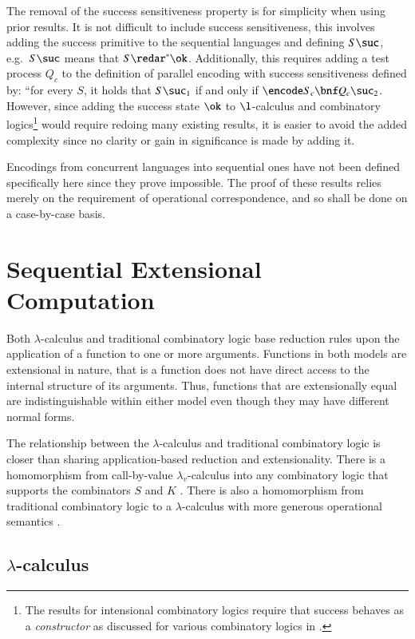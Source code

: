\documentclass{llncs}
\begin{document}
The removal of the success sensitiveness property is for simplicity when using prior
results.
It is not difficult to include success sensitiveness, this involves adding the success
primitive to the sequential languages and defining $S\suc$, e.g.~$S\suc$ means that
$S\redar^*\ok$.
Additionally, this requires adding a test process $Q_c$ to the definition of parallel encoding
with success sensitiveness defined by:
``for every $S$, it holds that $S \suc_1$ if and only if $\encode S _c \bnf Q_c\suc_2$.
However, since adding the success state $\ok$ to $\l$-calculus and combinatory
logics\footnote{The results for intensional combinatory logics require that success
behaves as a {\em constructor} as discussed for various combinatory logics in \cite{JayGW11}.}
would require redoing many existing results, it is easier to avoid the added
complexity since no clarity or gain in significance is made by adding it.

Encodings from concurrent languages into sequential ones have not been defined specifically
here since they prove impossible. The proof of these results relies merely on the
requirement of operational correspondence, and so shall be
done on a case-by-case basis.

\section{Sequential Extensional Computation}
\label{sec:sec}

Both $\lambda$-calculus and traditional combinatory logic base reduction rules upon the application of a function to one or more arguments.
Functions in both models are extensional in nature, that is a function does not have direct access to the internal structure of its arguments.
Thus, functions that are extensionally equal are indistinguishable within either model even though they may have different normal forms.

The relationship between the $\lambda$-calculus and traditional combinatory logic is closer than sharing application-based reduction and extensionality.
There is a homomorphism from call-by-value $\lambda_v$-calculus into any combinatory logic that supports the combinators $S$ and $K$ \cite{Curry58combinatorylogic,Barendregt85}.
There is also a homomorphism from traditional combinatory logic to a $\lambda$-calculus with more generous operational semantics \cite{Curry58combinatorylogic,Barendregt85}.

\subsection{$\lambda$-calculus}
\label{ssec:lambda}
\end{document}
